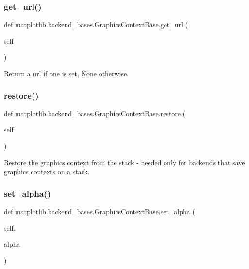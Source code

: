 \subsubsection{\texorpdfstring{get\+\_\+url()}{get\_url()}}
{\footnotesize\ttfamily def matplotlib.\+backend\+\_\+bases.\+Graphics\+Context\+Base.\+get\+\_\+url (\begin{DoxyParamCaption}\item[{}]{self }\end{DoxyParamCaption})}

\begin{DoxyVerb}Return a url if one is set, None otherwise.\end{DoxyVerb}
 \mbox{\label{classmatplotlib_1_1backend__bases_1_1GraphicsContextBase_acca6c45b2cc344fd587445ebfdc3d406}} 
\subsubsection{\texorpdfstring{restore()}{restore()}}
{\footnotesize\ttfamily def matplotlib.\+backend\+\_\+bases.\+Graphics\+Context\+Base.\+restore (\begin{DoxyParamCaption}\item[{}]{self }\end{DoxyParamCaption})}

\begin{DoxyVerb}Restore the graphics context from the stack - needed only
for backends that save graphics contexts on a stack.
\end{DoxyVerb}
 \mbox{\label{classmatplotlib_1_1backend__bases_1_1GraphicsContextBase_a14995bf596e720d5cf8423349e73560b}} 
\subsubsection{\texorpdfstring{set\+\_\+alpha()}{set\_alpha()}}
{\footnotesize\ttfamily def matplotlib.\+backend\+\_\+bases.\+Graphics\+Context\+Base.\+set\+\_\+alpha (\begin{DoxyParamCaption}\item[{}]{self,  }\item[{}]{alpha }\end{DoxyParamCaption})}

